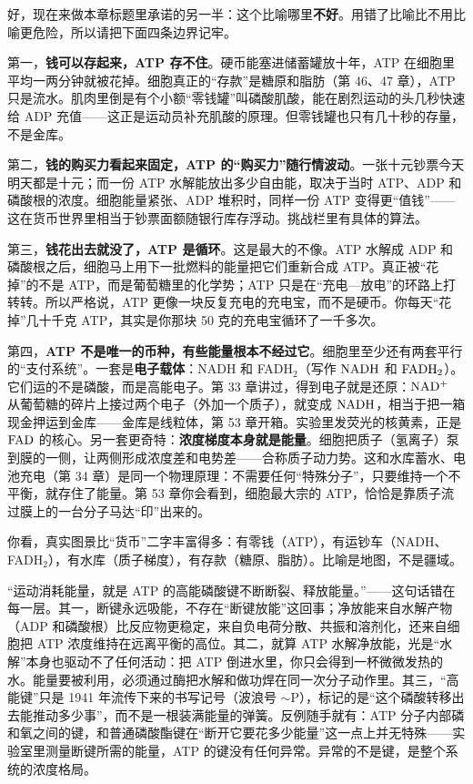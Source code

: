 好，现在来做本章标题里承诺的另一半：这个比喻哪里\textbf{不好}。用错了比喻比不用比喻更危险，所以请把下面四条边界记牢。

第一，\textbf{钱可以存起来，ATP 存不住}。硬币能塞进储蓄罐放十年，ATP 在细胞里平均一两分钟就被花掉。细胞真正的“存款”是糖原和脂肪（第 46、47 章），ATP 只是流水。肌肉里倒是有个小额“零钱罐”叫磷酸肌酸，能在剧烈运动的头几秒快速给 ADP 充值——这正是运动员补充肌酸的原理。但零钱罐也只有几十秒的存量，不是金库。

第二，\textbf{钱的购买力看起来固定，ATP 的“购买力”随行情波动}。一张十元钞票今天明天都是十元；而一份 ATP 水解能放出多少自由能，取决于当时 ATP、ADP 和磷酸根的浓度。细胞能量紧张、ADP 堆积时，同样一份 ATP 变得更“值钱”——这在货币世界里相当于钞票面额随银行库存浮动。挑战栏里有具体的算法。

第三，\textbf{钱花出去就没了，ATP 是循环}。这是最大的不像。ATP 水解成 ADP 和磷酸根之后，细胞马上用下一批燃料的能量把它们重新合成 ATP。真正被“花掉”的不是 ATP，而是葡萄糖里的化学势；ATP 只是在“充电—放电”的环路上打转转。所以严格说，ATP 更像一块反复充电的充电宝，而不是硬币。你每天“花掉”几十千克 ATP，其实是你那块 50 克的充电宝循环了一千多次。

第四，\textbf{ATP 不是唯一的币种，有些能量根本不经过它}。细胞里至少还有两套平行的“支付系统”。一套是\textbf{电子载体}：NADH 和 FADH$_2$（写作 $\mathrm{NADH}$ 和 $\mathrm{FADH_2}$）。它们运的不是磷酸，而是高能电子。第 33 章讲过，得到电子就是还原：$\mathrm{NAD^+}$ 从葡萄糖的碎片上接过两个电子（外加一个质子），就变成 $\mathrm{NADH}$，相当于把一箱现金押运到金库——金库是线粒体，第 53 章开箱。实验里发荧光的核黄素，正是 $\mathrm{FAD}$ 的核心。另一套更奇特：\textbf{浓度梯度本身就是能量}。细胞把质子（氢离子）泵到膜的一侧，让两侧形成浓度差和电势差——合称质子动力势。这和水库蓄水、电池充电（第 34 章）是同一个物理原理：不需要任何“特殊分子”，只要维持一个不平衡，就存住了能量。第 53 章你会看到，细胞最大宗的 ATP，恰恰是靠质子流过膜上的一台分子马达“印”出来的。

你看，真实图景比“货币”二字丰富得多：有零钱（ATP），有运钞车（NADH、FADH$_2$），有水库（质子梯度），有存款（糖原、脂肪）。比喻是地图，不是疆域。

\begin{wuqu}
“运动消耗能量，就是 ATP 的高能磷酸键不断断裂、释放能量。”——这句话错在每一层。其一，断键永远吸能，不存在“断键放能”这回事；净放能来自水解产物（ADP 和磷酸根）比反应物更稳定，来自负电荷分散、共振和溶剂化，还来自细胞把 ATP 浓度维持在远离平衡的高位。其二，就算 ATP 水解净放能，光是“水解”本身也驱动不了任何活动：把 ATP 倒进水里，你只会得到一杯微微发热的水。能量要被利用，必须通过酶把水解和做功焊在同一次分子动作里。其三，“高能键”只是 1941 年流传下来的书写记号（波浪号 $\sim$P），标记的是“这个磷酸转移出去能推动多少事”，而不是一根装满能量的弹簧。反例随手就有：ATP 分子内部磷和氧之间的键，和普通磷酸酯键在“断开它要花多少能量”这一点上并无特殊——实验室里测量断键所需的能量，ATP 的键没有任何异常。异常的不是键，是整个系统的浓度格局。
\end{wuqu}

